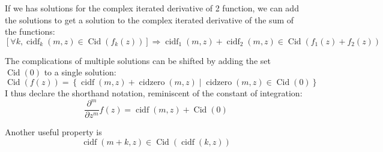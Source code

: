 \documentclass[]{article}
\DeclareMathOperator{\cidf}{cidf}
\DeclareMathOperator{\cidzero}{cidzero}
\DeclareMathOperator{\Cid}{Cid}
\newcommand{\pqty}[1]{{\left(#1\right)}}
\newcommand{\Bqty}[1]{{\left\{#1\right\}}}
\newcommand{\bqty}[1]{{\left[#1\right]}}
\newcommand{\pdiff}[2]{\frac{\partial^{#2}}{\partial #1^{#2}}}
\numberwithin{equation}{section}
\begin{document}
	If we has solutions for the complex iterated derivative of 2 function, we can add the solutions to get a solution to the complex iterated derivative of the sum of the functions:
	\begin{equation}
		\bqty{\forall k,\cidf_k\pqty{m,z}\in\Cid\pqty{f_k\pqty{z}}}
		\Rightarrow
		\cidf_1\pqty{m,z}+\cidf_2\pqty{m,z}\in\Cid\pqty{f_1\pqty{z}+f_2\pqty{z}}
	\end{equation}
	
	The complications of multiple solutions can be shifted by adding the set $\Cid\pqty{0}$ to a single solution:
	\begin{equation}
		\Cid\pqty{f\pqty{z}}=
		\Bqty{\cidf\pqty{m,z}+\cidzero\pqty{m,z} \mid \cidzero\pqty{m,z}\in\Cid\pqty{0}}
	\end{equation}
	I thus declare the shorthand notation, reminiscent of the constant of integration:
	\begin{equation}
		\pdiff{z}{m}f\pqty{z}=\cidf\pqty{m,z}+\Cid\pqty{0}
	\end{equation}
	
	Another useful property is
	\begin{equation}
		\label{cid m+k}
		\cidf\pqty{m+k,z}\in\Cid\pqty{\cidf\pqty{k,z}}
	\end{equation}
\end{document}
